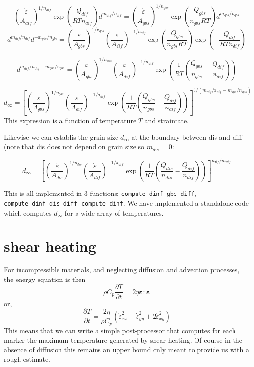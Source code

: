 \documentclass[a4paper]{article}
\begin{document}
\begin{itemize}
\[
\left(\frac{\dot\varepsilon}{A_{dif}}  \right)^{1/n_{dif}}
\exp\left(\frac{Q_{dif}}{RT n_{dif}} \right) d^{m_{dif}/n_{dif}} 
=
\left(\frac{\dot\varepsilon}{A_{gbs}} \right)^{1/n_{gbs}}
 \exp\left(\frac{Q_{gbs}}{n_{gbs}RT} \right)  d^{m_{gbs}/n_{gbs}}
\]
\[
d^{m_{dif}/n_{dif}}  d^{-m_{gbs}/n_{gbs}}
=
\left(\frac{\dot\varepsilon}{A_{gbs}} \right)^{1/n_{gbs}}
\left(\frac{\dot\varepsilon}{A_{dif}}  \right)^{-1/n_{dif}}
\exp\left(\frac{Q_{gbs}}{n_{gbs}RT} \right)  
\exp\left(-\frac{Q_{dif}}{RT n_{dif}} \right) 
\]

\[
d^{m_{dif}/n_{dif}-m_{gbs}/n_{gbs}}
=
\left(\frac{\dot\varepsilon}{A_{gbs}} \right)^{1/n_{gbs}}
\left(\frac{\dot\varepsilon}{A_{dif}}  \right)^{-1/n_{dif}}
\exp\left( \frac{1}{RT}  (\frac{Q_{gbs}}{n_{gbs}} -\frac{Q_{dif}}{n_{dif}}) \right) 
\]


\[
d_\infty
=
\left[\left(\frac{\dot\varepsilon}{A_{gbs}} \right)^{1/n_{gbs}}
\left(\frac{\dot\varepsilon}{A_{dif}}  \right)^{-1/n_{dif}}
\exp\left( \frac{1}{RT}  (\frac{Q_{gbs}}{n_{gbs}} -\frac{Q_{dif}}{n_{dif}}) \right) 
\right]^{1/(m_{dif}/n_{dif}-m_{gbs}/n_{gbs})}
\]
This expression is a function of temperature $T$ and strainrate.

Likewise we can establis the grain size $d_\infty$ at the boundary between dis and diff
(note that dis does not depend on grain size so $m_{dis}=0$:

\[
d_\infty
=
\left[\left(\frac{\dot\varepsilon}{A_{dis}} \right)^{1/n_{dis}}
\left(\frac{\dot\varepsilon}{A_{dif}}  \right)^{-1/n_{dif}}
\exp\left( \frac{1}{RT}  (\frac{Q_{dis}}{n_{dis}} -\frac{Q_{dif}}{n_{dif}}) \right) 
\right]^{n_{dif}/m_{dif}}
\]

This is all implemented in 3 functions:
\lstinline{compute_dinf_gbs_diff},
\lstinline{compute_dinf_dis_diff},
\lstinline{compute_dinf}.
We have implemented a standalone code which computes $d_\infty$ 
for a wide array of temperatures.




\end{itemize}



\section{shear heating}

For incompressible materials, and neglecting diffusion and advection processes, the energy equation is then
\[
\rho C_p \frac{\partial T}{\partial t} = 2 \eta \dot{\bm \varepsilon}:\dot{\bm \varepsilon}
\]
or, 
\[
\frac{\partial T}{\partial t} = \frac{2 \eta}{\rho C_p} (\dot{\varepsilon}_{xx}^2 + \dot{\varepsilon}_{yy}^2 + 2\dot{\varepsilon}_{xy}^2 ) 
\]
This means that we can write a simple post-processor that computes for each marker the maximum temperature
generated by shear heating. Of course in the absence of diffusion this remains an upper bound only meant 
to provide us with a rough estimate.


\newpage
\printbibliography
\end{document}
